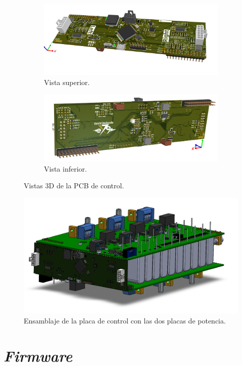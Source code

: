 \begin{figure}[H]
	\centering
	\begin{subfigure}{0.45\linewidth}
		\centering
		\includegraphics[width=\linewidth]{fig/invControl1}
		\caption{Vista superior.}
	\end{subfigure}
	\hspace{0.05\linewidth} %
	\begin{subfigure}{0.45\linewidth}
		\centering
		\includegraphics[width=\linewidth]{fig/invControl2}
		\caption{Vista inferior.}
	\end{subfigure}
	\caption{Vistas 3D de la PCB de control.}
	
\end{figure}


\begin{figure}[H]
	\centering
	\includegraphics[width=0.7\linewidth]{fig/invControl3}
	\caption{Ensamblaje de la placa de control con las dos placas de potencia.}
\end{figure}


\section{\textit{Firmware}}
